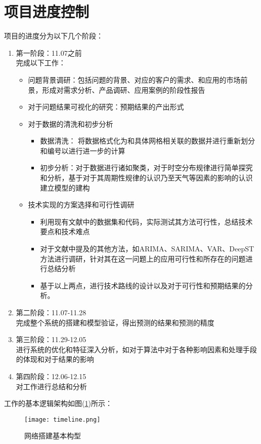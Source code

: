 \section{项目进度控制}
项目的进度分为以下几个阶段：
\begin{enumerate}
  \item 第一阶段：11.07之前\\
  完成以下工作：
  \begin{itemize}
    \item 问题背景调研：包括问题的背景、对应的客户的需求、和应用的市场前景，形成对需求分析、产品调研、应用案例的阶段性报告
    \item 对于问题结果可视化的研究：预期结果的产出形式
    \item 对于数据的清洗和初步分析
    \begin{itemize}
      \item 数据清洗： 将数据格式化为和具体网格相关联的数据并进行重新划分和编号以进行进一步的计算
      \item 初步分析：对于数据进行诸如聚类，对于时空分布规律进行简单探究和分析，基于对于其周期性规律的认识乃至天气等因素的影响的认识建立模型的建构
    \end{itemize}
    \item 技术实现的方案选择和可行性调研
    \begin{itemize}
      \item 利用现有文献中的数据集和代码，实际测试其方法可行性，总结技术要点和技术难点
      \item 对于文献中提及的其他方法，如ARIMA、SARIMA、VAR、DeepST方法进行调研，针对其在这一问题上的应用可行性和所存在的问题进行总结分析
      \item 基于以上两点，进行技术路线的设计以及对于可行性和预期结果的分析。
    \end{itemize}
  \end{itemize}
  \item 第二阶段：11.07-11.28\\
  完成整个系统的搭建和模型验证，得出预测的结果和预测的精度
  \item 第三阶段：11.29-12.05\\
  进行系统的优化和特征深入分析，如对于算法中对于各种影响因素和处理手段的体现和对于结果的影响\\
  \item 第四阶段：12.06-12.15\\
  对工作进行总结和分析
\end{enumerate}
工作的基本逻辑架构如图(\ref{fig:A1})所示：
\begin{figure}[ht]
\centering
\texttt{[image: timeline.png]}
\caption{网络搭建基本构型}
\label{fig:A1}
\end{figure}